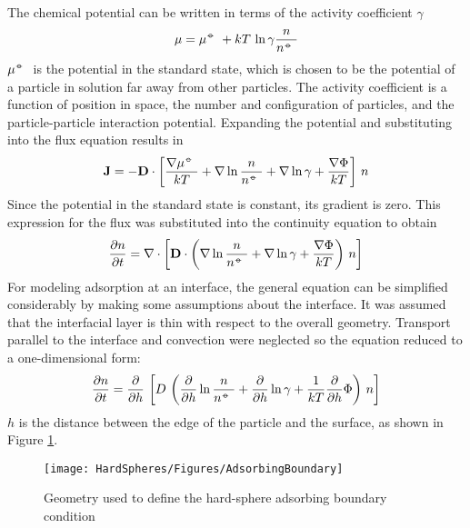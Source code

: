 The chemical potential can be written in terms of the activity coefficient
$\gamma$\begin{equation} \label{eq:ChemicalPotential}
\mu = \mu^\standardstate + kT \, \ln \gamma \frac{n}{n^ \standardstate}
\end{equation}\( \mu^\standardstate \) is the potential in the standard state,
which is chosen to be the potential of a particle in solution far
away from other particles. The activity coefficient is a function
of position in space, the number and configuration of particles, and
the particle-particle interaction potential. Expanding the potential
and substituting into the flux equation results in \begin{equation} \label{eq:Flux ito Potential}
\mathbf{J} = -\mathbf{D} \cdot \left[ \frac{\nabla \mu^\standardstate}{kT}
 + \nabla \ln \frac{n}{n^\standardstate} + \nabla \ln \gamma
 + \frac{\nabla \Phi}{kT}
 \right] \, n
\end{equation}Since the potential in the standard state is constant, its gradient
is zero. This expression for the flux was substituted into the continuity
equation to obtain\begin{equation} \label{eq:PDE 1}
\frac{\partial n}{ \partial t} =
 \nabla \cdot \left[ \mathbf{D} \cdot \left(
 \nabla \ln \frac{n}{n^\standardstate}
 + \nabla \ln \gamma + \frac{\nabla \Phi}{kT}
 \right) \, n \right]
\end{equation}For modeling adsorption at an interface, the general equation can
be simplified considerably by making some assumptions about the interface.
It was assumed that the interfacial layer is thin with respect to
the overall geometry. Transport parallel to the interface and convection
were neglected so the equation reduced to a one-dimensional form:\begin{equation} \label{eq:PDE 2}
\frac{\partial n}{ \partial t} =
 \frac{\partial}{ \partial h} \, \left[ D \, 
 \left(
 \frac{\partial}{ \partial h} \ln \frac{n}{n^\standardstate} 
 + \frac{\partial}{ \partial h} \ln \gamma
 + \frac{1}{kT} \frac{\partial}{ \partial h} \Phi
 \right) \, n \right]
\end{equation}$h$ is the distance between the edge of the particle and the surface,
as shown in Figure \ref{fig:Geometry}. %
\begin{figure}
\texttt{[image: HardSpheres/Figures/AdsorbingBoundary]}

\caption{\label{fig:Geometry}Geometry used to define the hard-sphere adsorbing
boundary condition}


%
\end{figure}


